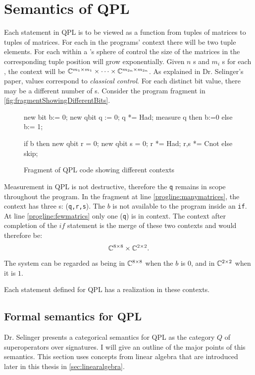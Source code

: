 \section{Semantics of QPL}\label{subsec:semanticsOfQPL}
Each statement in QPL is to be viewed as a function from tuples of
matrices to tuples of matrices. For each \bit{} in the programs' context
there will be two tuple elements. For each \qbit{} within a \bit{}'s 
sphere of control the size of the 
matrices in the corresponding tuple position will grow exponentially. 
Given $n$ \bit{}s and $m_i$ \qbit{}s for each \bit,
 the context will be
 $\mathbb{C}^{m_1 \times m_1} \times \cdots \times \mathbb{C}^{m_{2n} \times m_{2n}}$. 
As explained in Dr. Selinger's paper, \bit{} values 
correspond to \emph{classical control}. For each distinct bit value, there may
be a different number of \qbit{}s. Consider the program
fragment in \vref{fig:fragmentShowingDifferentBits}.

\begin{figure}[htbp]
\begin{qplcodethesis}
new bit b:= 0;
new qbit q := 0;
q *= Had;
measure q then
   b:=0
 else
   b:= 1;

if b then
  new qbit r = 0;
  new qbit s = 0;
  r *= Had; \label{progline:manymatrices}
  r,s *= Cnot
 else
  skip;\label{progline:fewmatrics}
\end{qplcodethesis}
\caption{Fragment of QPL code showing different contexts}
\label{fig:fragmentShowingDifferentBits}
\end{figure}

Measurement in QPL is not destructive, therefore the \qbit{} \texttt{q} 
remains in scope throughout the program.
In the fragment at line \ref{progline:manymatrices}, the 
context has three \qbit{}s: (\texttt{q,r,s}). The \bit{} $b$ is not available
to the program inside an \texttt{if}. At 
line \ref{progline:fewmatrics} only one \qbit{} (\texttt{q}) is in context.
The context after completion of the $if$ statement is the merge of these
two contexts and would therefore be:
\[ \mathbb{C}^{8\times 8} \times \mathbb{C}^{2 \times 2}.\]


The system can be regarded as being in $\mathbb{C}^{8\times8}$ when the
\bit{} $b$ is $0$, and in  $\mathbb{C}^{2 \times 2}$ when it is $1$.

Each statement defined for QPL has a realization in these contexts. 

\subsection{Formal semantics for QPL}\label{subsec:formalsemanticsqpl}
Dr. Selinger presents a categorical semantics for QPL as the
category $Q$ of superoperators over signatures. 
I will give an outline of the major points of this semantics. This 
section uses concepts from linear algebra that are introduced later in this
thesis in \vref{sec:linearalgebra}.

